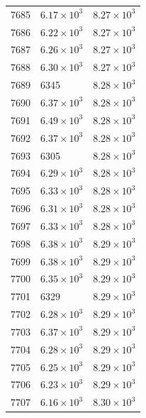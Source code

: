 \begin{table}[H]
\begin{tabular}{lll}
7685 & $\displaystyle 6.17 \times 10^{3}$ & $\displaystyle 8.27 \times 10^{3}$ \\
7686 & $\displaystyle 6.22 \times 10^{3}$ & $\displaystyle 8.27 \times 10^{3}$ \\
7687 & $\displaystyle 6.26 \times 10^{3}$ & $\displaystyle 8.27 \times 10^{3}$ \\
7688 & $\displaystyle 6.30 \times 10^{3}$ & $\displaystyle 8.27 \times 10^{3}$ \\
7689 & 6345 & $\displaystyle 8.28 \times 10^{3}$ \\
7690 & $\displaystyle 6.37 \times 10^{3}$ & $\displaystyle 8.28 \times 10^{3}$ \\
7691 & $\displaystyle 6.49 \times 10^{3}$ & $\displaystyle 8.28 \times 10^{3}$ \\
7692 & $\displaystyle 6.37 \times 10^{3}$ & $\displaystyle 8.28 \times 10^{3}$ \\
7693 & 6305 & $\displaystyle 8.28 \times 10^{3}$ \\
7694 & $\displaystyle 6.29 \times 10^{3}$ & $\displaystyle 8.28 \times 10^{3}$ \\
7695 & $\displaystyle 6.33 \times 10^{3}$ & $\displaystyle 8.28 \times 10^{3}$ \\
7696 & $\displaystyle 6.31 \times 10^{3}$ & $\displaystyle 8.28 \times 10^{3}$ \\
7697 & $\displaystyle 6.33 \times 10^{3}$ & $\displaystyle 8.28 \times 10^{3}$ \\
7698 & $\displaystyle 6.38 \times 10^{3}$ & $\displaystyle 8.29 \times 10^{3}$ \\
7699 & $\displaystyle 6.38 \times 10^{3}$ & $\displaystyle 8.29 \times 10^{3}$ \\
7700 & $\displaystyle 6.35 \times 10^{3}$ & $\displaystyle 8.29 \times 10^{3}$ \\
7701 & 6329 & $\displaystyle 8.29 \times 10^{3}$ \\
7702 & $\displaystyle 6.28 \times 10^{3}$ & $\displaystyle 8.29 \times 10^{3}$ \\
7703 & $\displaystyle 6.37 \times 10^{3}$ & $\displaystyle 8.29 \times 10^{3}$ \\
7704 & $\displaystyle 6.28 \times 10^{3}$ & $\displaystyle 8.29 \times 10^{3}$ \\
7705 & $\displaystyle 6.25 \times 10^{3}$ & $\displaystyle 8.29 \times 10^{3}$ \\
7706 & $\displaystyle 6.23 \times 10^{3}$ & $\displaystyle 8.29 \times 10^{3}$ \\
7707 & $\displaystyle 6.16 \times 10^{3}$ & $\displaystyle 8.30 \times 10^{3}$ \\

\end{tabular}
\end{table}
